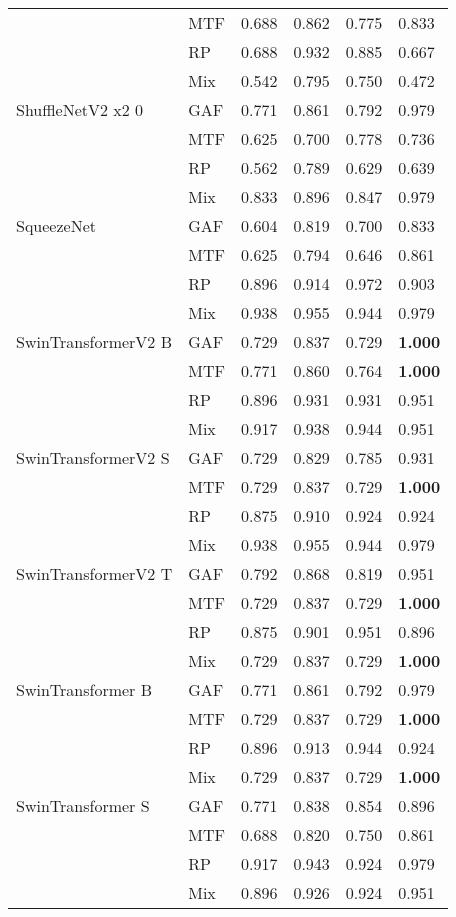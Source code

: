 \begin{tabular}[t]{llllll}
 & MTF & 0.688 & 0.862 & 0.775 & 0.833 \\
 & RP & 0.688 & 0.932 & 0.885 & 0.667 \\
 & Mix & 0.542 & 0.795 & 0.750 & 0.472 \\
ShuffleNetV2 x2 0 & GAF & 0.771 & 0.861 & 0.792 & 0.979 \\
 & MTF & 0.625 & 0.700 & 0.778 & 0.736 \\
 & RP & 0.562 & 0.789 & 0.629 & 0.639 \\
 & Mix & 0.833 & 0.896 & 0.847 & 0.979 \\
SqueezeNet & GAF & 0.604 & 0.819 & 0.700 & 0.833 \\
 & MTF & 0.625 & 0.794 & 0.646 & 0.861 \\
 & RP & 0.896 & 0.914 & 0.972 & 0.903 \\
 & Mix & 0.938 & 0.955 & 0.944 & 0.979 \\
SwinTransformerV2 B & GAF & 0.729 & 0.837 & 0.729 & \textbf{1.000} \\
 & MTF & 0.771 & 0.860 & 0.764 & \textbf{1.000} \\
 & RP & 0.896 & 0.931 & 0.931 & 0.951 \\
 & Mix & 0.917 & 0.938 & 0.944 & 0.951 \\
SwinTransformerV2 S & GAF & 0.729 & 0.829 & 0.785 & 0.931 \\
 & MTF & 0.729 & 0.837 & 0.729 & \textbf{1.000} \\
 & RP & 0.875 & 0.910 & 0.924 & 0.924 \\
 & Mix & 0.938 & 0.955 & 0.944 & 0.979 \\
SwinTransformerV2 T & GAF & 0.792 & 0.868 & 0.819 & 0.951 \\
 & MTF & 0.729 & 0.837 & 0.729 & \textbf{1.000} \\
 & RP & 0.875 & 0.901 & 0.951 & 0.896 \\
 & Mix & 0.729 & 0.837 & 0.729 & \textbf{1.000} \\
SwinTransformer B & GAF & 0.771 & 0.861 & 0.792 & 0.979 \\
 & MTF & 0.729 & 0.837 & 0.729 & \textbf{1.000} \\
 & RP & 0.896 & 0.913 & 0.944 & 0.924 \\
 & Mix & 0.729 & 0.837 & 0.729 & \textbf{1.000} \\
SwinTransformer S & GAF & 0.771 & 0.838 & 0.854 & 0.896 \\
 & MTF & 0.688 & 0.820 & 0.750 & 0.861 \\
 & RP & 0.917 & 0.943 & 0.924 & 0.979 \\
 & Mix & 0.896 & 0.926 & 0.924 & 0.951 \\
\bottomrule
\end{tabular}

